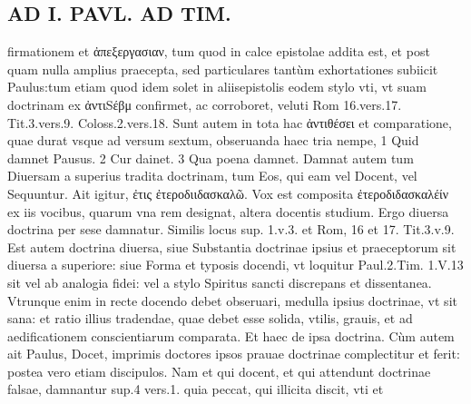 \documentclass{article}
\begin{document}
\begin{pages}
\section*{AD I. PAVL. AD TIM. }
\marginpar{[ p.414 ]}\pstart firmationem et ἀπεξεργασιαν, tum quod in calce epistolae addita est, et post quam nulla amplius praecepta, sed particulares tantùm exhortationes subiicit Paulus:tum etiam quod idem solet in aliisepistolis eodem stylo vti, vt suam doctrinam ex ἀντιSέβμ confirmet, ac corroboret, veluti Rom 16.vers.17. Tit.3.vers.9. Coloss.2.vers.18.  \pend\pstart Sunt autem in tota hac ἀντιθέσει et comparatione, quae durat vsque ad versum sextum, obseruanda haec tria nempe, 1 Quid damnet Pausus. 2 Cur dainet. 3 Qua poena damnet. Damnat autem tum Diuersam a superius tradita doctrinam, tum Eos, qui eam vel Docent, vel Sequuntur.  \pend\pstart Ait igitur, ἐτις ἐτεροδιιδασκαλῶ. Vox est composita ἐτεροδιδασκαλέίν ex iis vocibus, quarum vna rem designat, altera docentis studium. Ergo diuersa doctrina per sese damnatur. Similis locus sup. 1.v.3. et Rom, 16 et 17. Tit.3.v.9. Est autem doctrina diuersa, siue Substantia doctrinae ipsius et praeceptorum sit diuersa a superiore: siue Forma et typosis docendi, vt loquitur Paul.2.Tim. 1.V.13 sit vel ab analogia fidei: vel a stylo Spiritus sancti discrepans et dissentanea. Vtrunque  enim in recte docendo debet obseruari, medulla ipsius doctrinae, vt sit sana: et ratio illius tradendae, quae debet esse solida, vtilis, grauis, et ad aedificationem conscientiarum comparata. Et haec de ipsa doctrina.  \pend\pstart Cùm autem ait Paulus, Docet, imprimis doctores ipsos prauae doctrinae complectitur et ferit: postea vero etiam discipulos. Nam et qui docent, et qui attendunt doctrinae falsae, damnantur sup.4 vers.1. quia peccat, qui illicita discit, vti et  \pend

\end{pages}
\end{document}
